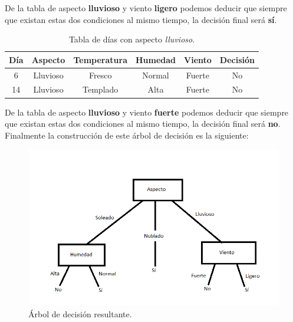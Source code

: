 \begin{UClist}
	De la tabla de aspecto \textbf{lluvioso} y viento \textbf{ligero} podemos deducir que siempre que existan estas dos condiciones al mismo tiempo, la decisión final será \textbf{sí}.\\

	\begin{table}[H]
		\begin{center}
			\label{tab:tablaInduccionAspectoLluvioso}
			\begin{tabular}{c|c|c|c|c|c}
				\textbf{Día} & \textbf{Aspecto} & \textbf{Temperatura} & \textbf{Humedad} & \textbf{Viento} & \textbf{Decisión}\\
				\hline
				6 & Lluvioso & Fresco & Normal & Fuerte & No\\
				14 & Lluvioso & Templado & Alta & Fuerte & No\\
			\end{tabular}
		\end{center}
		\caption{Tabla de días con aspecto \emph{lluvioso}.}
	\end{table}
	\newpage
	De la tabla de aspecto \textbf{lluvioso} y viento \textbf{fuerte} podemos deducir que siempre que existan estas dos condiciones al mismo tiempo, la decisión final será \textbf{no}.\\

	\UCli Finalmente la construcción de este árbol de decisión es la siguiente:

	\begin{figure}[H]
		\hypertarget{fig:arbol-decision-final}{\hspace{1pt}}
		\begin{center}
			\includegraphics{capitulo2/images/arbol-decision-final.png}
			\caption{Árbol de decisión resultante.}
			\label{fig:arbol-decision-final}
		\end{center}
	\end{figure}
\end{UClist}
